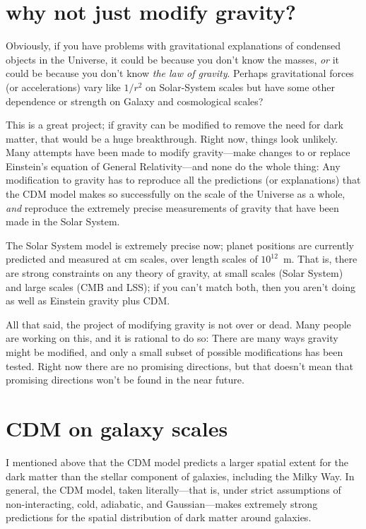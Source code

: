 \documentclass[12pt]{article}
\begin{document}
\section{why not just modify gravity?}

Obviously, if you have problems with gravitational explanations of
condensed objects in the Universe, it could be because you don't know
the masses, \emph{or} it could be because you don't know \emph{the law
  of gravity}.  Perhaps gravitational forces (or accelerations) vary
like $1/r^2$ on Solar-System scales but have some other dependence or
strength on Galaxy and cosmological scales?

This is a great project; if gravity can be modified to remove the need
for dark matter, that would be a huge breakthrough.  Right now, things
look unlikely.  Many attempts have been made to modify gravity---make
changes to or replace Einstein's equation of General Relativity---and
none do the whole thing: Any modification to gravity has to reproduce
all the predictions (or explanations) that the CDM model makes so
successfully on the scale of the Universe as a whole, \emph{and}
reproduce the extremely precise measurements of gravity that have been
made in the Solar System.

The Solar System model is extremely precise now; planet positions are
currently predicted and measured at cm scales, over length scales of
$10^12$~m.  That is, there are strong constraints on any theory of
gravity, at small scales (Solar System) and large scales (CMB and
LSS); if you can't match both, then you aren't doing as well as
Einstein gravity plus CDM.

All that said, the project of modifying gravity is not over or dead.
Many people are working on this, and it is rational to do so: There
are many ways gravity might be modified, and only a small subset of
possible modifications has been tested.  Right now there are no
promising directions, but that doesn't mean that promising directions
won't be found in the near future.

\section{CDM on galaxy scales}

I mentioned above that the CDM model predicts a larger spatial extent
for the dark matter than the stellar component of galaxies, including
the Milky Way.  In general, the CDM model, taken literally---that is,
under strict assumptions of non-interacting, cold, adiabatic, and
Gaussian---makes extremely strong predictions for the spatial
distribution of dark matter around galaxies.
\end{document}
